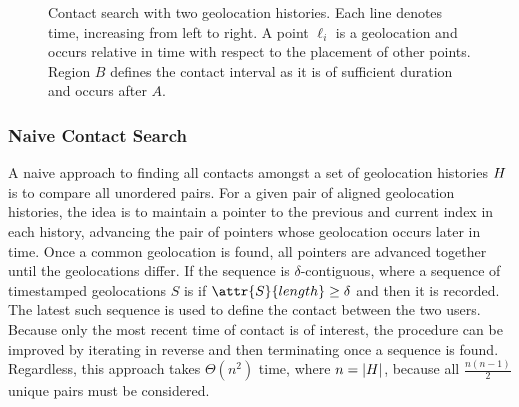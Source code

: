 \begin{figure}[htbp]
\centering
{}
\caption[Contact search with two geolocation histories]{Contact search with two geolocation histories. Each line denotes time, increasing from left to right. A point $\ell_i$ is a geolocation and occurs relative in time with respect to the placement of other points. Region $B$ defines the contact interval as it is of sufficient duration and occurs after $A$.}
\label{fig:contact-search}
\end{figure}

\subsubsection{Naive Contact Search}\label{sec:naive-contact-search}
A naive approach to finding all contacts amongst a set of geolocation histories $H$ is to compare all unordered pairs. For a given pair of aligned geolocation histories, the idea is to maintain a pointer to the previous and current index in each history, advancing the pair of pointers whose geolocation occurs later in time. Once a common geolocation is found, all pointers are advanced together until the geolocations differ. If the sequence is $\delta$-contiguous, where a sequence of timestamped geolocations $S$ is  if $\attr{S}{length} \geq \delta$ and
then it is recorded. The latest such sequence is used to define the contact between the two users. Because only the most recent time of contact is of interest, the procedure can be improved by iterating in reverse and then terminating once a sequence is found. Regardless, this approach takes $\Theta(n^2)$ time, where $n = \left\vert H \right\vert$, because all $\frac{n(n - 1)}{2}$ unique pairs must be considered.

